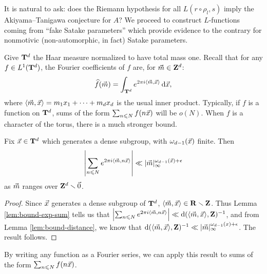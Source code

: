 It is natural to ask: does the Riemann hypothesis for all $L(r\circ \rho_l,s)$ 
imply the Akiyama--Tanigawa conjecture for $A$? We proceed to construct 
$L$-functions coming from ``fake Satake parameters'' which provide evidence to 
the contrary for nonmotivic (non-automorphic, in fact) Satake parameters. 

Give $\mathbf{T}^d$ the Haar measure normalized to have total mass one. 
Recall that for any $f\in L^1(\mathbf{T}^d)$, the Fourier coefficients of $f$ 
are, for $\vec{m}\in \mathbf{Z}^d$: 
\[
	\widehat f(\vec{m}) = \int_{\mathbf{T}^d} e^{2\pi i \langle \vec{m},\vec{x}\rangle} \, \mathrm{d} \vec{x} ,
\]
where $\langle \vec{m},\vec{x}\rangle = m_1 x_1 + \cdots + m_d x_d$ is the usual inner 
product. Typically, if $f$ is a function on $\mathbf{T}^d$, sums of the form 
$\sum_{n\leqslant N} f(n \vec{x})$ will be $o(N)$. When $f$ is a character of the 
torus, there is a much stronger bound. 

\begin{theorem}
Fix $\vec{x}\in \mathbf{T}^d$ which generates a dense subgroup, with $\omega_{d-1}(\vec{x})$ 
finite. Then 
\[
	\left| \sum_{n\leqslant N} e^{2\pi i \langle \vec{m}, n \vec{x}\rangle}\right| \ll |\vec{m}|_\infty^{\omega_{d-1}(\vec{x}) + \epsilon} 
\]
as $\vec{m}$ ranges over $\mathbf{Z}^d\smallsetminus \vec{0}$. 
\end{theorem}
\begin{proof}
Since $\vec{x}$ generates a dense subgroup of $\mathbf{T}^d$, 
$\langle \vec{m},\vec{x}\rangle\in \mathbf{R}\smallsetminus \mathbf{Z}$. Thus Lemma 
\ref{lem:bound-exp-sum} tells us that 
$\left| \sum_{n\leqslant N} e^{2\pi i \langle \vec{m}, n \vec{x}\rangle}\right| \ll \mathrm{d}(\langle \vec{m}, \vec{x}\rangle,\mathbf{Z})^{-1}$, 
and from Lemma \ref{lem:bound-distance}, we know that 
$\mathrm{d}(\langle \vec{m},\vec{x}\rangle, \mathbf{Z})^{-1} \ll |\vec{m}|_\infty^{\omega_{d-1}(x)+\epsilon}$. 
The result follows. 
\end{proof}

By writing any function as a Fourier series, we can apply this result to sums 
of the form $\sum_{n\leqslant N} f(n \vec{x})$. 

